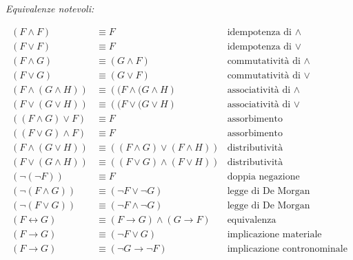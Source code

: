 \documentclass[italian, 10pt]{article}
\begin{document}
\bigskip

\textit{Equivalenze notevoli:}

\begin{align*}
  (F \land F)                      & \equiv F                                         & \text{idempotenza di } \land       \\
  (F \lor F)                       & \equiv F                                         & \text{idempotenza di } \lor        \\
  (F \land G)                      & \equiv (G\land F)                                & \text{commutatività di } \land     \\
  (F \lor G)                       & \equiv (G \lor F)                                & \text{commutatività di } \lor      \\
  \left(F \land (G \land H)\right) & \equiv \left((F \land (G \land H\right)          & \text{associatività di } \land     \\
  \left(F \lor (G \lor H)\right)   & \equiv \left((F \lor (G \lor H\right)            & \text{associatività di } \lor      \\
  \left((F \land G) \lor F\right)  & \equiv F                                         & \text{assorbimento}                \\
  \left((F \lor G) \land F\right)  & \equiv F                                         & \text{assorbimento}                \\
  (F \land \left(G \lor H\right))  & \equiv \left((F \land G) \lor (F \land H)\right) & \text{distributività}              \\
  (F \lor \left(G \land H\right))  & \equiv \left((F \lor G) \land (F \lor H)\right)  & \text{distributività}              \\
  \left(\lnot (\lnot F)\right)     & \equiv F                                         & \text{doppia negazione}            \\
  \left(\lnot (F \land G)\right)   & \equiv (\lnot F \lor \lnot G)                    & \text{legge di De Morgan}          \\
  \left(\lnot (F \lor G)\right)    & \equiv (\lnot F \land \lnot G)                   & \text{legge di De Morgan}          \\
  (F \leftrightarrow G)            & \equiv (F \rightarrow G) \land (G \rightarrow F) & \text{equivalenza}                 \\
  (F \rightarrow G)                & \equiv (\lnot F \lor G)                          & \text{implicazione materiale}      \\
  (F \rightarrow G)                & \equiv (\lnot G \rightarrow \lnot F)             & \text{implicazione contronominale} \\
\end{align*}
\end{document}
